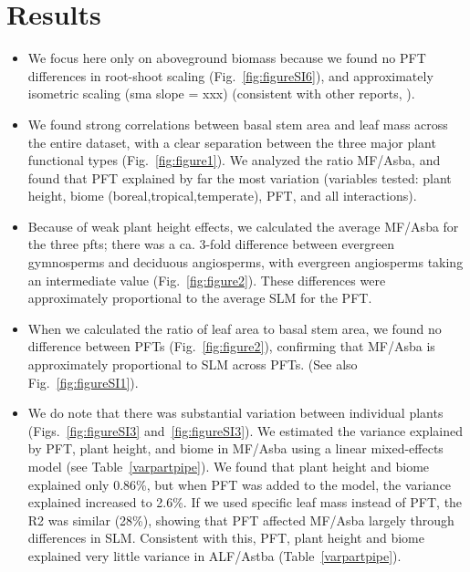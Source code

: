 \documentclass[a4paper]{article}\usepackage[]{graphicx}\usepackage[]{color}
\begin{document}
\section{Results}


\begin{itemize}

\item We focus here only on aboveground biomass because we found no PFT differences in root-shoot scaling (Fig.~\ref{fig:figureSI6}), and approximately isometric scaling (sma slope = xxx) (consistent with other reports, \cite{hui_near_2014, cairns_root_1997}).

\item We found strong correlations between basal stem area and leaf mass across the entire dataset, with a clear separation between the three major plant functional types (Fig.~\ref{fig:figure1}). We analyzed the ratio MF/Asba, and found that PFT explained by far the most variation (variables tested: plant height, biome (boreal,tropical,temperate), PFT, and all interactions).

\item Because of weak plant height effects, we calculated the average MF/Asba for the three pfts; there was a ca. 3-fold difference between evergreen gymnosperms and deciduous angiosperms, with evergreen angiosperms taking an intermediate value (Fig.~\ref{fig:figure2}). These differences were approximately proportional to the average SLM for the PFT. 

\item When we calculated the ratio of leaf area to basal stem area, we found no difference between PFTs (Fig.~\ref{fig:figure2}), confirming that MF/Asba is approximately proportional to SLM across PFTs. (See also Fig.~\ref{fig:figureSI1}).

\item We do note that there was substantial variation between individual plants (Figs.~\ref{fig:figureSI3} and~\ref{fig:figureSI3}). We estimated the variance explained by PFT, plant height, and biome in MF/Asba using a linear mixed-effects model (see Table~\ref{varpartpipe}). We found that plant height and biome explained only 0.86\%, but when PFT was added to the model, the variance explained increased to 2.6\%. If we used specific leaf mass instead of PFT, the R2 was similar (28\%), showing that PFT affected MF/Asba largely through differences in SLM. Consistent with this, PFT, plant height and biome explained very little variance in ALF/Astba (Table~\ref{varpartpipe}).


\end{itemize}
\end{document}
